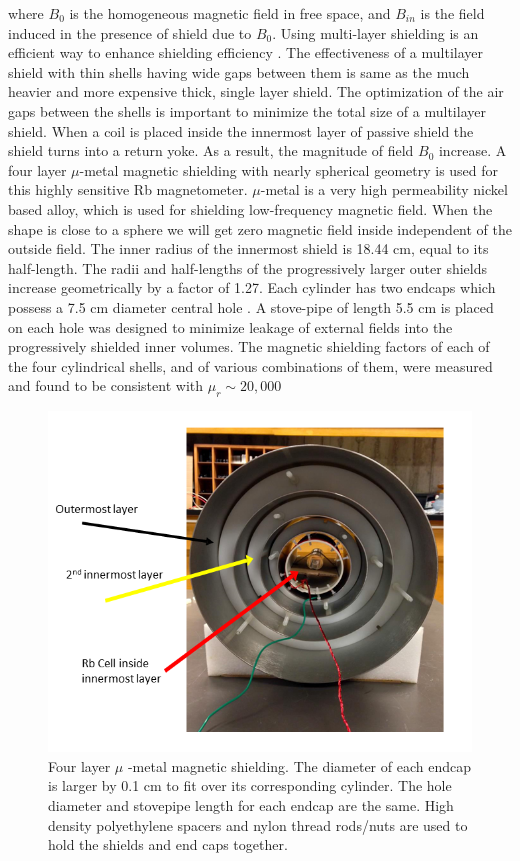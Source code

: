 where $B_0$ is the homogeneous magnetic field in free space, and $B_{in}$ is the field induced in the presence of shield due to  $B_0$. Using multi-layer shielding is an efficient way to enhance shielding efficiency \cite{doe:website2} . The effectiveness of a multilayer shield with thin shells having wide gaps between them is same as the much heavier and more expensive thick, single layer shield.
The optimization of the air gaps between the shells is important to minimize the total size of a multilayer shield. When a coil is placed inside the innermost layer of passive shield the shield turns into a return yoke. As a result, the magnitude of field $B_0$ increase. A four layer $\mu$-metal magnetic shielding with nearly spherical geometry is used for this highly sensitive Rb magnetometer. $\mu$-metal is a very high permeability nickel based alloy, which is used for shielding low-frequency magnetic field. When the shape is close to a sphere we will get zero magnetic field inside independent of the outside field. The inner radius of the innermost shield is 18.44 cm, equal to its half-length. The radii and half-lengths of the progressively larger outer shields increase geometrically by a factor of 1.27. Each cylinder has two endcaps which possess a 7.5 cm diameter central hole \cite{Andalib:2016ahj}. A stove-pipe of length 5.5 cm is placed on each hole was designed to minimize leakage of external fields into the progressively shielded inner volumes. The magnetic shielding factors of each of the four cylindrical shells, and of various combinations of them, were measured and found to be consistent with $\mu_r \sim 20, 000$ \cite{Martin:2014foa}
\begin{figure}[h]
\centering
\includegraphics[width=1.0\linewidth]{figures/magnetic_shielding}
 \caption{Four layer $\mu$ -metal magnetic shielding. The diameter of each endcap is larger by 0.1 cm to fit over its corresponding cylinder. The hole diameter and stovepipe length for each endcap are the same. High density polyethylene spacers and nylon thread rods/nuts are used to hold the shields and end caps together.}
\end{figure}

